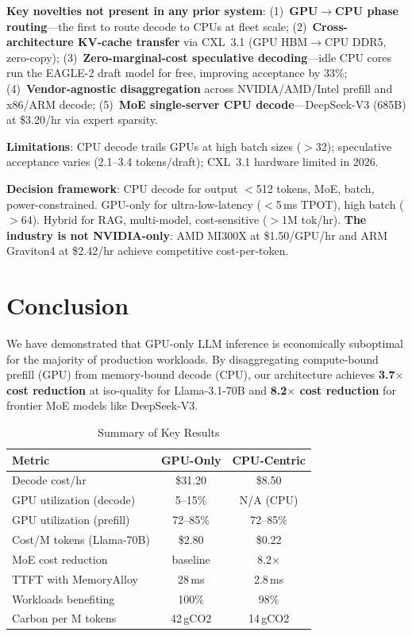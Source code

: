 \documentclass[conference,10pt]{IEEEtran}
\begin{document}
\textbf{Key novelties not present in any prior system}: (1)~\textbf{GPU$\to$CPU phase routing}---the first to route decode to CPUs at fleet scale; (2)~\textbf{Cross-architecture KV-cache transfer} via CXL~3.1 (GPU HBM$\to$CPU DDR5, zero-copy); (3)~\textbf{Zero-marginal-cost speculative decoding}---idle CPU cores run the EAGLE-2 draft model for free, improving acceptance by 33\%; (4)~\textbf{Vendor-agnostic disaggregation} across NVIDIA/AMD/Intel prefill and x86/ARM decode; (5)~\textbf{MoE single-server CPU decode}---DeepSeek-V3 (685B) at \$3.20/hr via expert sparsity.

\textbf{Limitations}: CPU decode trails GPUs at high batch sizes ($>$32); speculative acceptance varies (2.1--3.4 tokens/draft); CXL~3.1 hardware limited in 2026.

\textbf{Decision framework}: CPU decode for output $<$512 tokens, MoE, batch, power-constrained. GPU-only for ultra-low-latency ($<$5\,ms TPOT), high batch ($>$64). Hybrid for RAG, multi-model, cost-sensitive ($>$1M tok/hr). \textbf{The industry is not NVIDIA-only}: AMD MI300X at \$1.50/GPU/hr and ARM Graviton4 at \$2.42/hr achieve competitive cost-per-token.

\section{Conclusion}
\label{sec:conc}

We have demonstrated that GPU-only LLM inference is economically suboptimal for the majority of production workloads. By disaggregating compute-bound prefill (GPU) from memory-bound decode (CPU), our architecture achieves \textbf{3.7$\times$ cost reduction} at iso-quality for Llama-3.1-70B and \textbf{8.2$\times$ cost reduction} for frontier MoE models like DeepSeek-V3.

\begin{table}[!htbp]
\caption{Summary of Key Results}
\label{tab:summary}
\centering\footnotesize
\begin{tabular}{@{}lcc@{}}
\toprule
\textbf{Metric} & \textbf{GPU-Only} & \textbf{CPU-Centric} \\
\midrule
Decode cost/hr & \$31.20 & \$8.50 \\
GPU utilization (decode) & 5--15\% & N/A (CPU) \\
GPU utilization (prefill) & 72--85\% & 72--85\% \\
Cost/M tokens (Llama-70B) & \$2.80 & \$0.22 \\
MoE cost reduction & baseline & 8.2$\times$ \\
TTFT with MemoryAlloy & 28\,ms & 2.8\,ms \\
Workloads benefiting & 100\% & 98\% \\
Carbon per M tokens & 42\,gCO2 & 14\,gCO2 \\
\bottomrule
\end{tabular}
\end{table}
\end{document}
